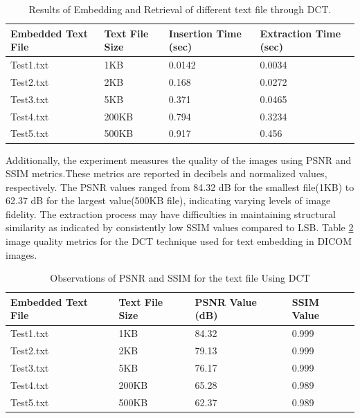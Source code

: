 \documentclass{ieeeaccess}
\begin{document}
\begin{table}[htbp]
\centering
\caption{Results of Embedding and Retrieval of different text file through DCT.}
\label{DCT-TXT}

\begin{tabular}{|p{2.2 cm}|p{1.5 cm}|p{1.5 cm}|p{1.5 cm}|}
\hline
\textbf{Embedded Text File} & \textbf{Text File Size} & \textbf{Insertion Time (sec)} & \textbf{Extraction Time (sec)} \\ \hline
Test1.txt & 1KB & 0.0142
 & 0.0034
 \\ \hline
Test2.txt & 2KB & 0.168
 & 0.0272
 \\ \hline
Test3.txt & 5KB & 0.371
 & 0.0465
 \\ \hline
Test4.txt & 200KB & 0.794
 & 0.3234
\\ \hline
Test5.txt & 500KB & 0.917
 & 0.456
 \\ \hline

\end{tabular}
\end{table}


Additionally, the experiment measures the quality of the images using PSNR and SSIM metrics.These metrics are reported in decibels and normalized values, respectively. The PSNR values ranged from 84.32 dB for the smallest file(1KB) to 62.37 dB for the largest value(500KB file), indicating varying levels of image fidelity. The extraction process may have difficulties in maintaining structural similarity as indicated by consistently low SSIM values compared to LSB. Table \ref{psnr-dct} image quality metrics for the DCT technique used for text embedding in DICOM images.

\begin{table}[htbp]
\centering
\caption{Observations of PSNR and SSIM for the text file Using DCT}
\label{psnr-dct}
\begin{tabular}{|p{2.2 cm}|p{1.5 cm}|p{1.5 cm}|p{1.5 cm}|}
\hline
\textbf{Embedded Text File} & \textbf{Text File Size} & \textbf{PSNR
Value (dB)
} & \textbf{SSIM
Value
} \\ \hline
Test1.txt & 1KB & 84.32
 & 0.999
 \\ \hline
Test2.txt & 2KB & 79.13
 & 0.999
\\ \hline
Test3.txt & 5KB & 76.17
 & 0.999
 \\ \hline
Test4.txt & 200KB & 65.28  & 0.989
\\ \hline
Test5.txt & 500KB & 62.37  & 0.989
 \\ \hline

\end{tabular}
\end{table}
\end{document}
